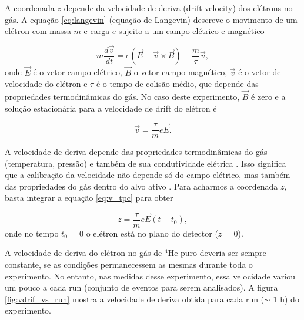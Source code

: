 \documentclass[a4paper,12pt,oneside]{book}
\begin{document}
\par A coordenada $z$ depende da velocidade de deriva (drift velocity) dos elétrons no gás. A equação \ref{eq:langevin} (equação de Langevin) descreve o movimento de um elétron com massa $m$ e carga $e$ sujeito a um campo elétrico e magnético \cite{drift_constant}

\begin{equation}\label{eq:langevin}
    m\frac{d\vec{v}}{dt} = e\left(\vec{E} +\vec{v}\times \vec{B}\right) - \frac{m}{\tau}\vec{v},
\end{equation}
%
onde $\vec{E}$ é o vetor campo elétrico, $\vec{B}$ o vetor campo magnético, $\vec{v}$ é o vetor de velocidade do elétron e $\tau$ é o tempo de colisão médio, que depende das propriedades termodinâmicas do gás. No caso deste experimento, $\vec{B}$ é zero e a solução estacionária para a velocidade de drift do elétron é

\begin{equation}\label{eq:v_tpc}
    \vec{v} = \frac{\tau}{m}e\vec{E}.
\end{equation}

\par A velocidade de deriva depende das propriedades termodinâmicas do gás (temperatura, pressão) e também de sua condutividade elétrica \cite{drift_constant}. Isso significa que a calibração da velocidade não depende só do campo elétrico, mas também das propriedades do gás dentro do alvo ativo \cite{pattpc, drift_constant}. Para acharmos a coordenada $z$, basta integrar a equação \ref{eq:v_tpc} para obter

\begin{equation}
    z = \frac{\tau}{m}e\vec{E}(t - t_0),
\end{equation}
%
onde no tempo $t_0$ = 0 o elétron está no plano do detector ($z$ = 0).

\par A velocidade de deriva do elétron no gás de $^4$He puro deveria ser sempre constante, se as condições permanecessem as mesmas durante toda o experimento. No entanto, nas medidas desse experimento, essa velocidade variou um pouco a cada run (conjunto de eventos para serem analisados). A figura \ref{fig:vdrif_vs_run} mostra a velocidade de deriva obtida para cada run ($\sim$ 1 h) do experimento.
\end{document}
